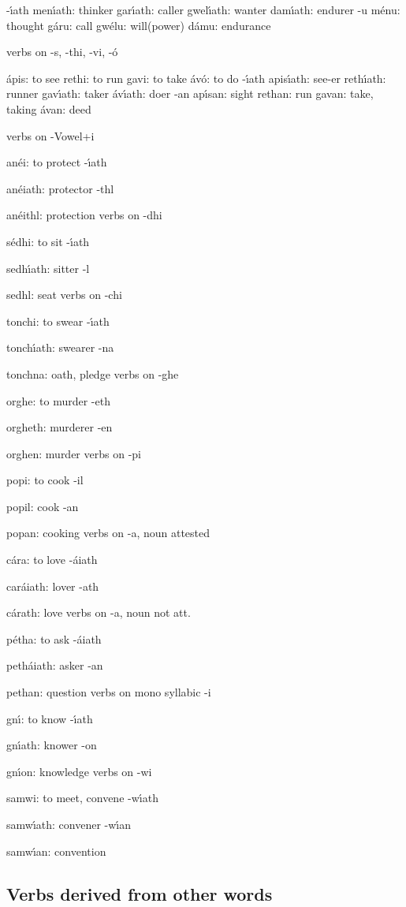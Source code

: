 	-\'{\i}ath
men\'{\i}ath: thinker
gar\'{\i}ath: caller
gwel\'{\i}ath: wanter
dam\'{\i}ath: endurer
	-u
m\'{e}nu: thought
g\'{a}ru: call
gw\'{e}lu: will(power)
d\'{a}mu: endurance

verbs on -s, -thi, -vi, -\'{o}

\'{a}pis: to see
rethi: to run
gavi: to take
\'{a}v\'{o}: to do
	-\'{\i}ath
apis\'{\i}ath: see-er
reth\'{\i}ath: runner
gav\'{\i}ath: taker
\'{a}v\'{\i}ath: doer
	-an
ap\'{\i}san: sight
rethan: run
gavan: take, taking
\'{a}van: deed

verbs on -Vowel+i

an\'{e}i: to protect
	-\'{\i}ath

an\'{e}iath: protector
	-thl

an\'{e}ithl: protection
verbs on -dhi

s\'{e}dhi: to sit
	-\'{\i}ath

sedh\'{\i}ath: sitter
	-l

sedhl: seat
verbs on -chi

tonchi: to swear
	-\'{\i}ath

tonch\'{\i}ath: swearer
	-na

tonchna: oath, pledge
verbs on -ghe

orghe: to murder
	-eth

orgheth: murderer
	-en

orghen: murder
verbs on -pi

popi: to cook
	-il

popil: cook
	-an

popan: cooking
verbs on -a, noun attested

c\'{a}ra: to love
	-\'{a}iath

car\'{a}iath: lover
	-ath

c\'{a}rath: love
verbs on -a, noun not att.

p\'{e}tha: to ask
	-\'{a}iath

peth\'{a}iath: asker
	-an

pethan: question
verbs on mono syllabic -i

gn\'{\i}: to know
	-\'{\i}ath

gn\'{\i}ath: knower
	-on

gn\'{\i}on: knowledge
verbs on -wi

samwi: to meet, convene
	-w\'{\i}ath

samw\'{\i}ath: convener
	-w\'{\i}an

samw\'{\i}an: convention

\subsection{Verbs derived from other words}

